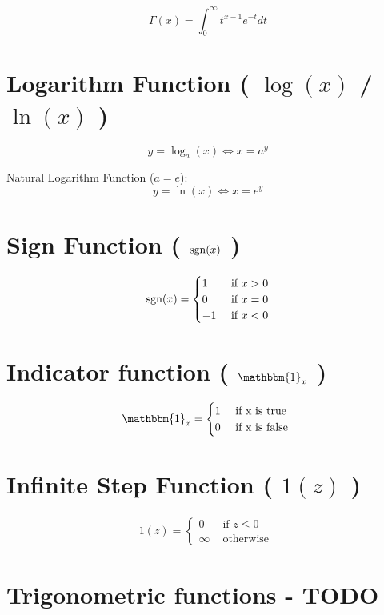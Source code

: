 \[
    \Gamma(x) = \displaystyle\int_{0}^{\infty} t^{x-1} e^{-t} dt
\]


\section{Logarithm Function ( $\log(x)$ / $\ln(x)$ )}\label{Logarithm Function}
\[
    y = \log_a(x) \Leftrightarrow x = a^y
\]

Natural Logarithm Function ($a=e$):
\[
    y = \ln(x) \Leftrightarrow x = e^y
\]


\section{Sign Function ( $\operatorname{sgn}(x)$ )}\label{Sign Function}
\begin{align}
    \operatorname{sgn}(x) = \begin{cases}
         1 & \text{ if } x > 0 \\
         0 & \text{ if } x = 0 \\
         -1 & \text{ if } x < 0 
        \end{cases}
\end{align}



\section{Indicator function ( $\mathbbm{1}_x$ )}\label{Indicator function}

\begin{align}
    \mathbbm{1}_x = {\begin{cases}
        1 & \text{ if x is true } \\
        0 & \text{ if x is false }
    \end{cases}}
\end{align}

\section{Infinite Step Function ( $1(z)$ )}

\begin{align}
    1(z) = {\begin{cases}
        0 & \text{ if } z \leq 0 \\
        \infty & \text{ otherwise }
    \end{cases}}
\end{align}

\section{Trigonometric functions - TODO \cite{wiki-Trigonometric_functions}}\label{Trigonometric functions}

